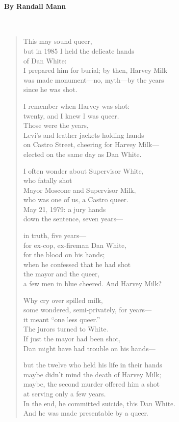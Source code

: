 \paragraph{By Randall Mann}~
\begin{verse}
	This may sound queer,\\
	but in 1985 I held the delicate hands\\
	of Dan White:\\
	I prepared him for burial; by then, Harvey Milk\\
	was made monument—no, myth—by the years\\
	since he was shot.

	I remember when Harvey was shot:\\
	twenty, and I knew I was queer.\\
	Those were the years,\\
	Levi’s and leather jackets holding hands\\
	on Castro Street, cheering for Harvey Milk—\\
	elected on the same day as Dan White.

	I often wonder about Supervisor White,\\
	who fatally shot\\
	Mayor Moscone and Supervisor Milk,\\
	who was one of us, a Castro queer.\\
	May 21, 1979: a jury hands\\
	down the sentence, seven years—

	in truth, five years—\\
	for ex-cop, ex-fireman Dan White,\\
	for the blood on his hands;\\
	when he confessed that he had shot\\
	the mayor and the queer,\\
	a few men in blue cheered. And Harvey Milk?

	Why cry over spilled milk,\\
	some wondered, semi-privately, for years—\\
	it meant “one less queer.”\\
	The jurors turned to White.\\
	If just the mayor had been shot,\\
	Dan might have had trouble on his hands—

	but the twelve who held his life in their hands\\
	maybe didn’t mind the death of Harvey Milk;\\
	maybe, the second murder offered him a shot\\
	at serving only a few years.\\
	In the end, he committed suicide, this Dan White.\\
	And he was made presentable by a queer.
\end{verse}

